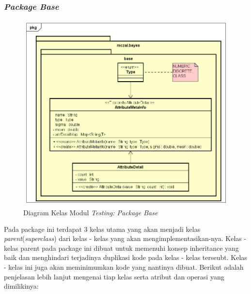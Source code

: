 \subsubsection{\textit{Package Base}}
\begin{figure}[H]
	\centering
	\includegraphics[scale=0.64]{ClassDiagramLengkap/CD_Test_BASE}
	\caption[Diagram Kelas Modul \textit{Testing: Package Base}]{Diagram Kelas Modul \textit{Testing: Package Base}}
	\label{fig:Diagram Kelas Modul Testing: Package Base}
\end{figure}

Pada package ini terdapat 3 kelas utama yang akan menjadi kelas \textit{parent}(\textit{superclass}) dari kelas - kelas yang akan mengimplementasikan-nya. Kelas - kelas parent pada package ini dibuat untuk memenuhi konsep inheritance yang baik dan menghindari terjadinya duplikasi kode pada kelas - kelas terseubt. Kelas - kelas ini juga akan meminimumkan kode yang nantinya dibuat. Berikut adalah penjelasan lebih lanjut mengenai tiap kelas serta atribut dan operasi yang dimilikinya:


